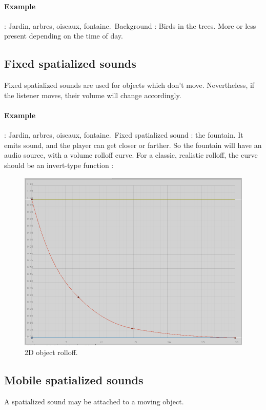 \documentclass[a4paper,10pt]{article}
\begin{document}
\paragraph{Example} : Jardin, arbres, oiseaux, fontaine.\
Background : Birds in the trees. More or less present depending on the time of day.


\subsection{Fixed spatialized sounds}
Fixed spatialized sounds are used for objects which don't move. Nevertheless, if the listener moves, their volume will change accordingly.

\paragraph{Example} : Jardin, arbres, oiseaux, fontaine.\
Fixed spatialized sound : the fountain. It emits sound, and the player can get closer or farther. So the fountain will have an audio source, with a volume rolloff curve. For a classic, realistic rolloff, the curve should be an invert-type function : \

\begin{figure}[h]
\centering
\caption{2D object rolloff.}
\includegraphics[width=0.5\linewidth]{logRolloff}
\end{figure}



\subsection{Mobile spatialized sounds}
A spatialized sound may be attached to a moving object.
\end{document}
